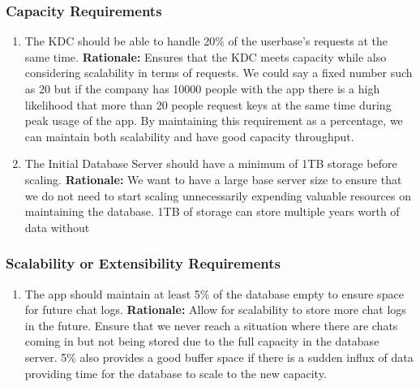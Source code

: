 \documentclass[]{article}
\begin{document}
\subsubsection{Capacity Requirements}
\label{ssub:capacity_requirements}
\begin{enumerate}[{PR-C}1. ]
	\item The KDC should be able to handle 20\% of the userbase’s requests at the same time. \newline
	      \textbf{Rationale:} Ensures that the KDC meets capacity while also considering scalability in terms of requests. We could say a fixed number such as 20 but if the company has 10000 people with the app there is a high likelihood that more than 20 people request keys at the same time during peak usage of the app. By maintaining this requirement as a percentage, we can maintain both scalability and have good capacity throughput.
	\item The Initial Database Server should have a minimum of 1TB storage before scaling. \newline
	      \textbf{Rationale:}  We want to have a large base server size to ensure that we do not need to start scaling unnecessarily expending valuable resources on maintaining the database. 1TB of storage can store multiple years worth of data without

\end{enumerate}

\subsubsection{Scalability or Extensibility Requirements}
\label{ssub:scalability_or_extensibility_requirements}
\begin{enumerate}[{PR-SE}1. ]
	\item The app should maintain at least 5\% of the database empty to ensure space for future chat logs. \newline
	      \textbf{Rationale:} Allow for scalability to store more chat logs in the future. Ensure that we never reach a situation where there are chats coming in but not being stored due to the full capacity in the database server. 5\% also provides a good buffer space if there is a sudden influx of data providing time for the database to scale to the new capacity.

\end{enumerate}
\end{document}
